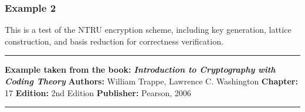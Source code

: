 \documentclass[a4paper,12pt]{article}
\begin{document}
\subsubsection*{Example 2 }\label{example-3-reference}

This is a test of the NTRU encryption scheme, including key generation,  
lattice construction, and basis reduction for correctness verification.

\begin{center}\rule{0.5\linewidth}{0.5pt}\end{center}

 \textbf{Example taken from the book:} \textbf{\emph{Introduction to
Cryptography with Coding Theory}} \textbf{Authors:} William Trappe,
Lawrence C. Washington \textbf{Chapter:} 17 \textbf{Edition:} 2nd
Edition \textbf{Publisher:} Pearson, 2006

\begin{center}\rule{0.5\linewidth}{0.5pt}\end{center}
\end{document}
